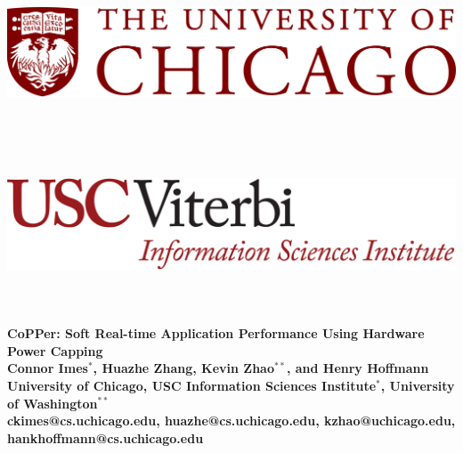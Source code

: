 \documentclass[a0,portrait]{a0poster}
\begin{document}

\begin{minipage}[b]{\linewidth}
\begin{center}
\includegraphics[height=5cm]{figures/uchicago_logo.png} %
\hspace{27cm}
\includegraphics[height=5cm]{figures/VsoE_ISI_Inform_Horiz_CardonWhite-03-cropped.png}\\
\vspace{0.25cm}
\noindent\makebox[\linewidth]{\rule{0.9\paperwidth}{0.4pt}}
\vspace{0.25cm}
\end{center}

\Huge \color{NavyBlue} \textbf{CoPPer: Soft Real-time Application Performance Using Hardware Power Capping} \color{Black}\\[0.5cm] %
\huge \textbf{Connor Imes$^*$, Huazhe Zhang, Kevin Zhao$^{**}$, and Henry Hoffmann}\\[0.25cm] %
\LARGE \textbf{University of Chicago, USC Information Sciences Institute$^*$, University of Washington$^{**}$}\\ %
\Large \textbf{ckimes@cs.uchicago.edu, huazhe@cs.uchicago.edu, kzhao@uchicago.edu, hankhoffmann@cs.uchicago.edu}
\end{minipage}
%
\end{document}
